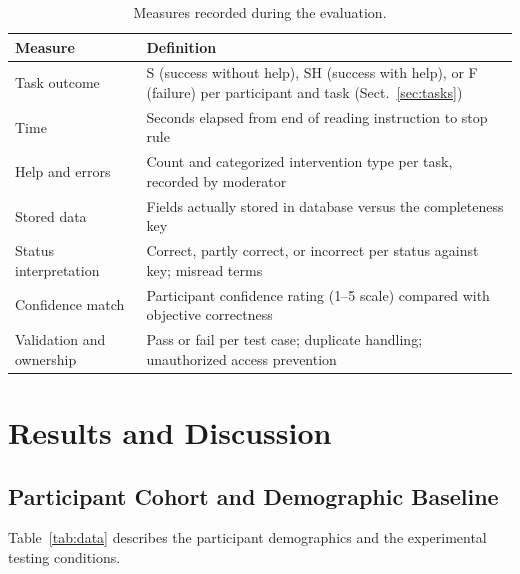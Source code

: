 \documentclass[11pt, runningheads, a4paper]{llncs}
\begin{document}
\begin{table}[!htbp]
\caption{Measures recorded during the evaluation.}
\label{tab:measures}
\centering
\scriptsize
\setlength{\tabcolsep}{5pt}
\renewcommand{\arraystretch}{1.18}
\begin{tabularx}{\textwidth}{@{}L{3.4cm} Y@{}}
\toprule
Measure & Definition \\
\midrule
Task outcome & S (success without help), SH (success with help), or F (failure) per participant and task (Sect.~\ref{sec:tasks}) \\
\addlinespace[1pt]
Time & Seconds elapsed from end of reading instruction to stop rule \\
\addlinespace[1pt]
Help and errors & Count and categorized intervention type per task, recorded by moderator \\
\addlinespace[1pt]
Stored data & Fields actually stored in database versus the completeness key \\
\addlinespace[1pt]
Status interpretation & Correct, partly correct, or incorrect per status against key; misread terms \\
\addlinespace[1pt]
Confidence match & Participant confidence rating (1--5 scale) compared with objective correctness \\
\addlinespace[1pt]
Validation and ownership & Pass or fail per test case; duplicate handling; unauthorized access prevention \\
\bottomrule
\end{tabularx}
\end{table}

\section{Results and Discussion}

\subsection{Participant Cohort and Demographic Baseline}
Table~\ref{tab:data} describes the participant demographics and the experimental testing conditions.
\end{document}
